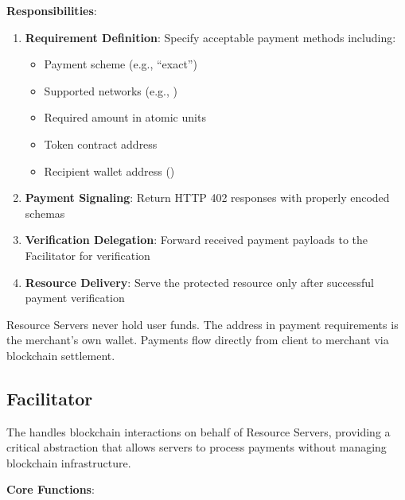 \textbf{Responsibilities}:

\begin{enumerate}
    \item \textbf{Requirement Definition}: Specify acceptable payment methods including:
    \begin{itemize}
        \item Payment scheme (e.g., ``exact'')
        \item Supported networks (e.g., )
        \item Required amount in atomic units
        \item Token contract address
        \item Recipient wallet address ()
    \end{itemize}

    \item \textbf{Payment Signaling}: Return HTTP 402 responses with properly encoded  schemas

    \item \textbf{Verification Delegation}: Forward received payment payloads to the Facilitator for verification

    \item \textbf{Resource Delivery}: Serve the protected resource only after successful payment verification
\end{enumerate}

\begin{infobox}
Resource Servers never hold user funds. The  address in payment requirements is the merchant's own wallet. Payments flow directly from client to merchant via blockchain settlement.
\end{infobox}

\subsection{Facilitator}
\label{subsec:facilitator}

The  handles blockchain interactions on behalf of Resource Servers, providing a critical abstraction that allows servers to process payments without managing blockchain infrastructure.

\textbf{Core Functions}:

